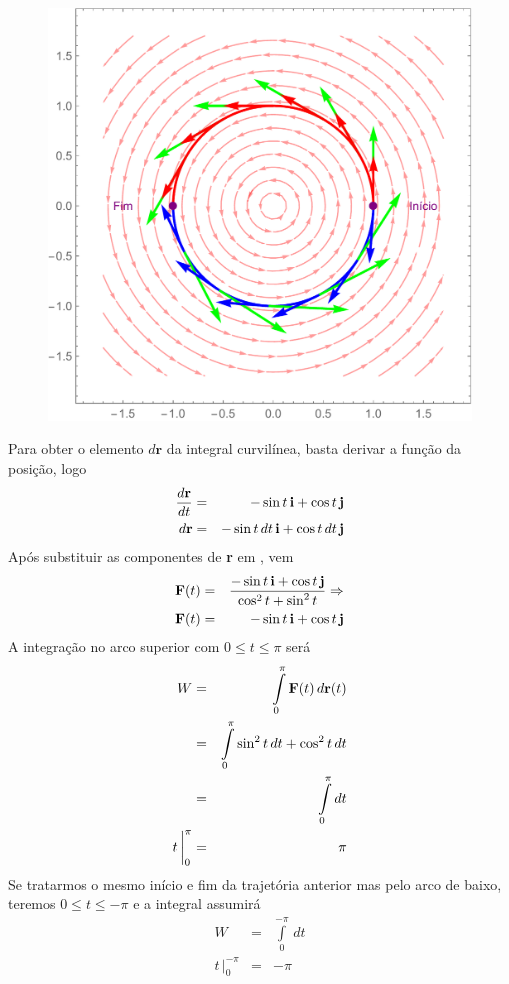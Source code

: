 \documentclass[a4paper, 12pt, brazilian]{article}
\begin{document}
	\begin{figure}[H]
		\centering
		\includegraphics[width=0.7\linewidth]{images/g26}
		\label{fig:g26}
	\end{figure}
	\noindent Para obter o elemento $d\textbf{r}$ da integral curvilínea, basta derivar a função da posição, logo
	\begin{eqnarray}
		\dfrac{d\textbf{r}}{dt}&=&-\sin t\,\textbf{i}+\cos t\,\textbf{j}\\
		d\textbf{r}&=&-\sin t\,dt\,\textbf{i}+\cos t\,dt\,\textbf{j}
	\end{eqnarray}
	Após substituir as componentes de \textbf{r} em \force, vem
	\begin{eqnarray}
		\textbf{F}(t)&=&\dfrac{-\sin t\,\textbf{i}+\cos t\,\textbf{j}}{\cos^{2}t+\sin^{2}t}\Rightarrow\\
		\textbf{F}(t)&=&-\sin t\,\textbf{i}+\cos t\,\textbf{j}
	\end{eqnarray}
	A integração no arco superior com $0\leq t\leq\pi$ será
	\begin{eqnarray}
		W&=&\int\limits_{0}^{\pi}\textbf{F}(t)\,d\textbf{r}(t)\\
		&=&\int\limits_{0}^{\pi}\sin^{2}t\,dt+\cos^{2}t\,dt\\
		&=&\int\limits_{0}^{\pi}dt\\
		t\,\bigg|_{0}^{\pi}&=&\pi
	\end{eqnarray}
	Se tratarmos o mesmo início e fim da trajetória anterior mas pelo arco de baixo, teremos $0\leq t\leq -\pi$ e a integral assumirá	
	\begin{eqnarray}
		W&=&\int\limits_{0}^{-\pi}\,dt\\
		t\,\bigg|_{0}^{-\pi}&=&-\pi\\
	\end{eqnarray}
\end{document}

